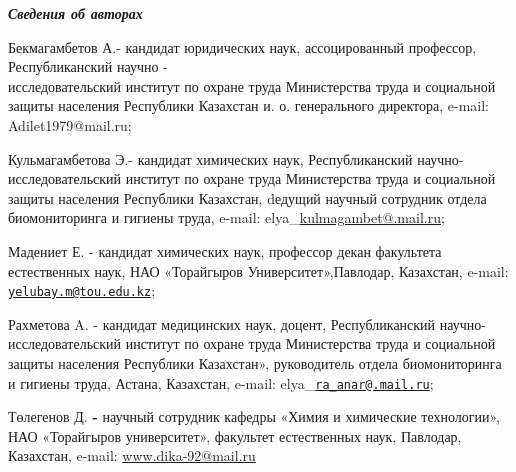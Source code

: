 \begin{authorinfo}
\emph{{\bfseries Сведения об авторах}}

Бекмагамбетов А.- кандидат юридических наук, ассоцированный профессор,
Республиканский научно -\\исследовательский институт по охране труда
Министерства труда и социальной защиты населения Республики Казахстан и.
о. генерального директора, e-mail: Adilet1979@mail.ru;

Кульмагамбетова Э.- кандидат химических наук, Республиканский
научно-исследовательский институт по охране труда Министерства труда и
социальной защиты населения Республики Казахстан, dедущий научный
сотрудник отдела биомониторинга и гигиены труда, e-mail:
elya\_\href{mailto:kulmagambet@.mail.ruedu.kz}{kulmagambet@.mail.ru};

Мадениет Е. - кандидат химических наук, профессор декан факультета
естественных наук, НАО «Торайгыров Университет»,Павлодар, Казахстан,
e-mail:
\href{mailto:yelubay.m@tou.edu.kz}{\nolinkurl{yelubay.m@tou.edu.kz}};

Рахметова A. - кандидат медицинских наук, доцент, Республиканский
научно-исследовательский институт по охране труда Министерства труда и
социальной защиты населения Республики Казахстан», руководитель отдела
биомониторинга и гигиены труда, Астана, Казахстан, e-mail:
elya\_\href{mailto:ra_anar@.mail.ru}{\nolinkurl{ra\_anar@.mail.ru}};

Төлегенов Д. {\bfseries -} научный сотрудник кафедры «Химия и химические
технологии», НАО «Торайгыров университет», факультет естественных наук,
Павлодар, Казахстан, e-mail:
\href{http://www.dika-92@mail.ru}{www.dika-92@mail.ru}
\end{authorinfo}
